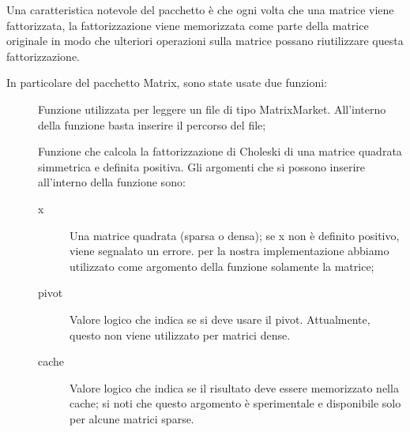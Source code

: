 Una caratteristica notevole del pacchetto è che ogni volta che una matrice viene fattorizzata, la fattorizzazione viene memorizzata come parte della matrice originale in modo che ulteriori operazioni sulla matrice possano riutilizzare questa fattorizzazione.

In particolare del pacchetto Matrix, sono state usate due funzioni:

\begin{description}
\item[\verb!readMM()] Funzione utilizzata per leggere un file di tipo MatrixMarket. All'interno della funzione basta inserire il percorso del file;
\item[\verb!chol()] Funzione che calcola la fattorizzazione di Choleski di una matrice quadrata simmetrica e definita positiva. Gli argomenti che si possono inserire all'interno della funzione sono:
\begin{description}
\item[x] Una matrice quadrata (sparsa o densa); se x non è definito positivo, viene segnalato un errore. per la nostra implementazione abbiamo utilizzato come argomento della funzione solamente la matrice;
\item[pivot] Valore logico che indica se si deve usare il pivot. Attualmente, questo non viene utilizzato per matrici dense.
\item[cache] Valore logico che indica se il risultato deve essere memorizzato nella cache; si noti che questo argomento è sperimentale e disponibile solo per alcune matrici sparse.
\end{description}
\end{description}
